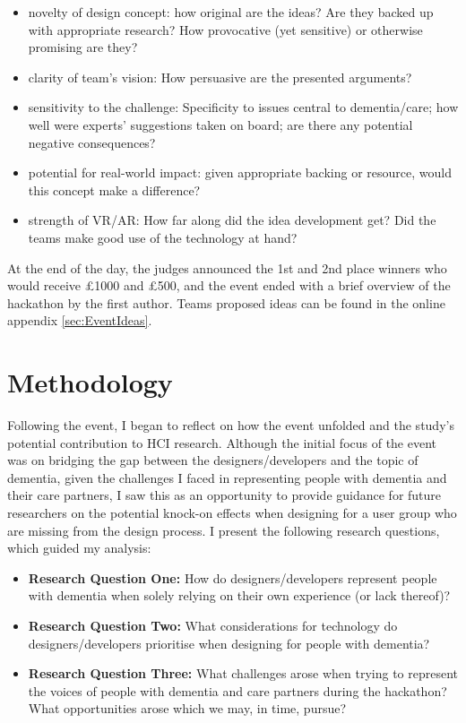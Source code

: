 \begin{itemize}
\item novelty of design concept: how original are the ideas? Are they backed up with appropriate research? How provocative (yet sensitive) or otherwise promising are they?
\item clarity of team's vision: How persuasive are the presented arguments?
\item sensitivity to the challenge: Specificity to issues central to dementia/care; how well were experts’ suggestions taken on board; are there any potential negative consequences?
\item potential for real-world impact: given appropriate backing or resource, would this concept make a difference?
\item strength of VR/AR: How far along did the idea development get? Did the teams make good use of the technology at hand? 
\end{itemize}

At the end of the day, the judges announced the 1st and 2nd place winners who would receive £1000 and £500, and the event ended with a brief overview of the hackathon by the first author. Teams proposed ideas can be found in the online appendix \ref{sec:EventIdeas}.

\section{Methodology}
\label{sec:methodology}
Following the event, I began to reflect on how the event unfolded and the study's potential contribution to HCI research. Although the initial focus of the event was on bridging the gap between the designers/developers and the topic of dementia, given the challenges I faced in representing people with dementia and their care partners, I saw this as an opportunity to provide guidance for future researchers on the potential knock-on effects when designing for a user group who are missing from the design process. I present the following research questions, which guided my analysis:

\begin{itemize}
    \item \textbf{Research Question One:} How do designers/developers represent people with dementia when solely relying on their own experience (or lack thereof)? 

    \item \textbf{Research Question Two:} What considerations for technology do designers/developers prioritise when designing for people with dementia?

    \item \textbf{Research Question Three:}  What challenges arose when trying to represent the voices of people with dementia and care partners during the hackathon? What opportunities arose which we may, in time, pursue?

\end{itemize}

